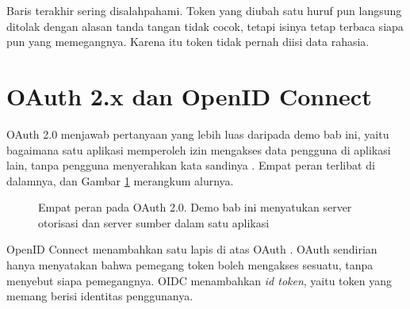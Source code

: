 Baris terakhir sering disalahpahami. Token yang diubah satu huruf pun langsung
ditolak dengan alasan tanda tangan tidak cocok, tetapi isinya tetap terbaca
siapa pun yang memegangnya. Karena itu token tidak pernah diisi data rahasia.

\section{OAuth 2.x dan OpenID Connect}

OAuth 2.0 menjawab pertanyaan yang lebih luas daripada demo bab ini, yaitu
bagaimana satu aplikasi memperoleh izin mengakses data pengguna di aplikasi
lain, tanpa pengguna menyerahkan kata sandinya \cite{rfc6749}. Empat peran
terlibat di dalamnya, dan Gambar \ref{fig:oauth} merangkum alurnya.

\begin{figure}[!htb]
  \centering
  \caption{Empat peran pada OAuth 2.0. Demo bab ini menyatukan server
           otorisasi dan server sumber dalam satu aplikasi}
  \label{fig:oauth}
\end{figure}

OpenID Connect menambahkan satu lapis di atas OAuth \cite{oidc-core}. OAuth
sendirian hanya menyatakan bahwa pemegang token boleh mengakses sesuatu,
tanpa menyebut siapa pemegangnya. OIDC menambahkan \textit{id token}, yaitu
token yang memang berisi identitas penggunanya.

